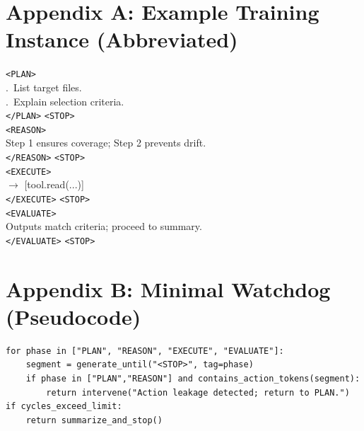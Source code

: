 \documentclass[11pt]{article}
\begin{document}
\section*{Appendix A: Example Training Instance (Abbreviated)}
\noindent\texttt{<PLAN>}\\
.~List target files.\\
.~Explain selection criteria.\\
\texttt{</PLAN>} \texttt{<STOP>}\\
\texttt{<REASON>}\\
\quad Step 1 ensures coverage; Step 2 prevents drift.\\
\texttt{</REASON>} \texttt{<STOP>}\\
\texttt{<EXECUTE>}\\
 $\rightarrow$ [tool.read(...)]\\
\texttt{</EXECUTE>} \texttt{<STOP>}\\
\texttt{<EVALUATE>}\\
\quad Outputs match criteria; proceed to summary.\\
\texttt{</EVALUATE>} \texttt{<STOP>}

\section*{Appendix B: Minimal Watchdog (Pseudocode)}
\begin{verbatim}
for phase in ["PLAN", "REASON", "EXECUTE", "EVALUATE"]:
    segment = generate_until("<STOP>", tag=phase)
    if phase in ["PLAN","REASON"] and contains_action_tokens(segment):
        return intervene("Action leakage detected; return to PLAN.")
if cycles_exceed_limit:
    return summarize_and_stop()
\end{verbatim}
\end{document}
